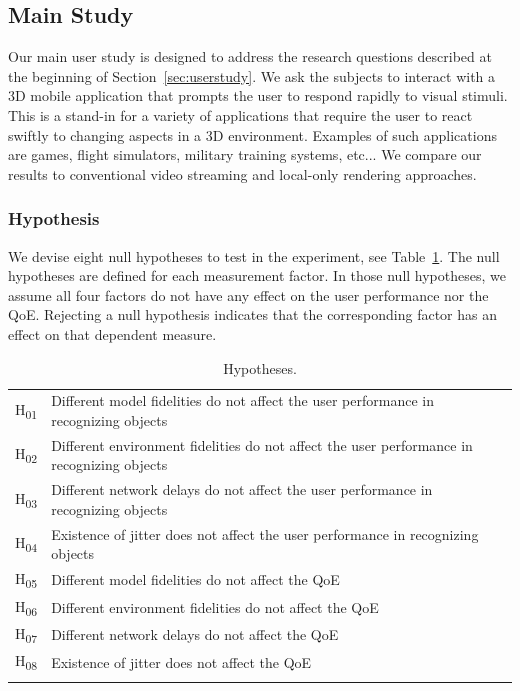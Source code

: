 \subsection{Main Study}
\label{sec:ms}

Our main user study is designed to address the research questions described at the beginning of Section~\ref{sec:userstudy}.
We ask the subjects to interact with a 3D mobile application that prompts the user to respond rapidly to visual stimuli. This is a stand-in for a variety of applications that require the user to react swiftly to changing aspects in a 3D environment. Examples of such applications are games, flight simulators, military training systems, etc... We compare our results to conventional video streaming and local-only rendering approaches.

\subsubsection{Hypothesis}

We devise eight null hypotheses to test in the experiment, see Table~\ref{tab:hypo}. The null hypotheses are defined for each measurement factor. In those null hypotheses, we assume all four factors do not have any effect on the user performance nor the QoE. Rejecting a null hypothesis indicates that the corresponding factor has an effect on that dependent measure.

\begin{table}[!htbp]
\caption{Hypotheses.}
\label{tab:hypo}
\begin{tabular}{ll}
\noalign{\smallskip}\hline\noalign{\smallskip}
H\textsubscript{01} & Different model fidelities do not affect the user performance in recognizing objects \\
H\textsubscript{02} & Different environment fidelities do not affect the user performance in recognizing objects \\
H\textsubscript{03} & Different network delays do not affect the user performance in recognizing objects \\
H\textsubscript{04} & Existence of jitter does not affect the user performance in recognizing objects \\
H\textsubscript{05} & Different model fidelities do not affect the QoE \\
H\textsubscript{06} & Different environment fidelities do not affect the QoE \\
H\textsubscript{07} & Different network delays do not affect the QoE \\
H\textsubscript{08} & Existence of jitter does not affect the QoE \\
\noalign{\smallskip}\hline
\end{tabular}
\end{table}

